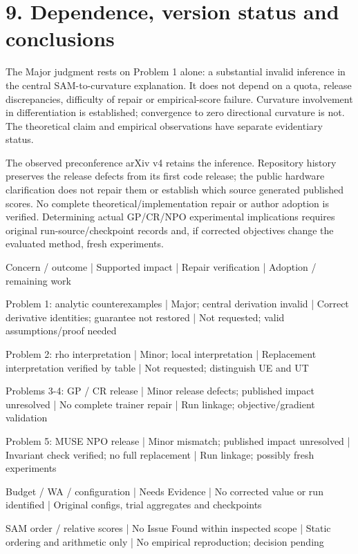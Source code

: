 \documentclass[10pt]{article}
\begin{document}
\section*{9. Dependence, version status and conclusions}
The Major judgment rests on Problem 1 alone: a substantial invalid inference in the central SAM-to-curvature explanation. It does not depend on a quota, release discrepancies, difficulty of repair or empirical-score failure. Curvature involvement in differentiation is established; convergence to zero directional curvature is not. The theoretical claim and empirical observations have separate evidentiary status.\par
The observed preconference arXiv v4 retains the inference. Repository history preserves the release defects from its first code release; the public hardware clarification does not repair them or establish which source generated published scores. No complete theoretical/implementation repair or author adoption is verified. Determining actual GP/CR/NPO experimental implications requires original run-source/checkpoint records and, if corrected objectives change the evaluated method, fresh experiments.\par
Concern / outcome | Supported impact | Repair verification | Adoption / remaining work\par
Problem 1: analytic counterexamples | Major; central derivation invalid | Correct derivative identities; guarantee not restored | Not requested; valid assumptions/proof needed\par
Problem 2: rho interpretation | Minor; local interpretation | Replacement interpretation verified by table | Not requested; distinguish UE and UT\par
Problems 3-4: GP / CR release | Minor release defects; published impact unresolved | No complete trainer repair | Run linkage; objective/gradient validation\par
Problem 5: MUSE NPO release | Minor mismatch; published impact unresolved | Invariant check verified; no full replacement | Run linkage; possibly fresh experiments\par
Budget / WA / configuration | Needs Evidence | No corrected value or run identified | Original configs, trial aggregates and checkpoints\par
SAM order / relative scores | No Issue Found within inspected scope | Static ordering and arithmetic only | No empirical reproduction; decision pending\par
\end{document}
